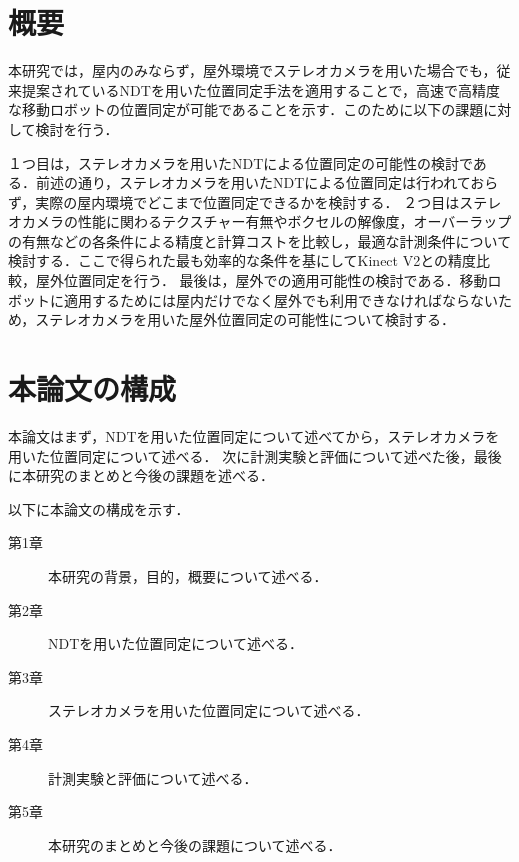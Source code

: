 \section{概要}

本研究では，屋内のみならず，屋外環境でステレオカメラを用いた場合でも，従来提案されているNDTを用いた位置同定手法を適用することで，高速で高精度な移動ロボットの位置同定が可能であることを示す．このために以下の課題に対して検討を行う．

１つ目は，ステレオカメラを用いたNDTによる位置同定の可能性の検討である．前述の通り，ステレオカメラを用いたNDTによる位置同定は行われておらず，実際の屋内環境でどこまで位置同定できるかを検討する．
２つ目はステレオカメラの性能に関わるテクスチャー有無やボクセルの解像度，オーバーラップの有無などの各条件による精度と計算コストを比較し，最適な計測条件について検討する．ここで得られた最も効率的な条件を基にしてKinect V2との精度比較，屋外位置同定を行う．
最後は，屋外での適用可能性の検討である．移動ロボットに適用するためには屋内だけでなく屋外でも利用できなければならないため，ステレオカメラを用いた屋外位置同定の可能性について検討する．
%
\newpage
\section{本論文の構成}
本論文はまず，NDTを用いた位置同定について述べてから，ステレオカメラを用いた位置同定について述べる．
次に計測実験と評価について述べた後，最後に本研究のまとめと今後の課題を述べる．

以下に本論文の構成を示す．
\begin{description}
 \item[第1章] 本研究の背景，目的，概要について述べる．
 \item[第2章] NDTを用いた位置同定について述べる．
 \item[第3章] ステレオカメラを用いた位置同定について述べる．
 \item[第4章] 計測実験と評価について述べる．
 \item[第5章] 本研究のまとめと今後の課題について述べる．
 \end{description}
